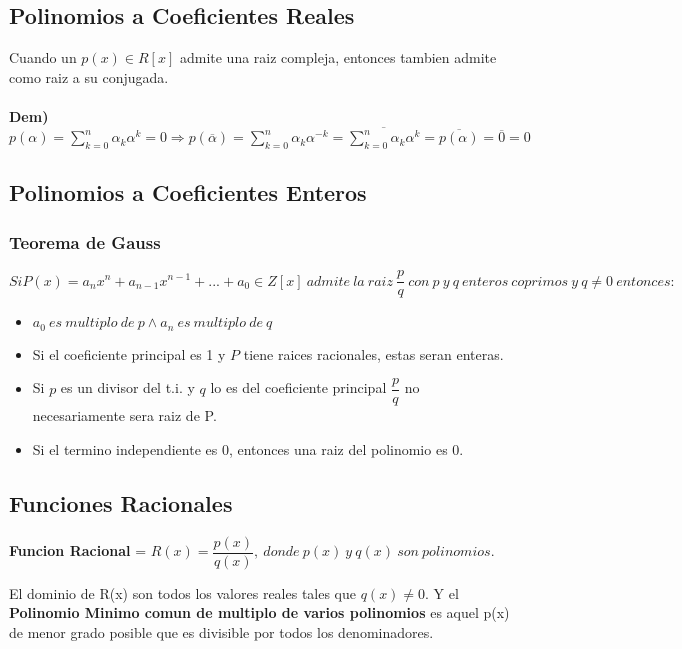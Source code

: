 \documentclass[10pt]{article}
\begin{document}
\subsection{Polinomios a Coeficientes Reales}
Cuando un $p(x) \in R[x]$ admite una raiz compleja, entonces tambien admite como raiz a su conjugada.\\
\\
\textbf{Dem) }$p(\alpha) = \sum\limits_{k=0}^n\alpha_k \alpha^k=0 \Rightarrow p(\overline{\alpha}) = \sum\limits_{k=0}^n\alpha_k \alpha^{-k}= \overline{\sum\limits_{k=0}^n\alpha_k \alpha^{k}} = \overline{p(\alpha)} = \overline{0} = 0$
\subsection{Polinomios a Coeficientes Enteros}
\subsubsection{Teorema de Gauss}
\begin{mdframed}[roundcorner=10pt]
$Si P(x)=a_nx^n+a_{n-1}x^{n-1}+...+a_0 \in Z[x]\ admite\ la\ raiz\ \dfrac{p}{q}\ con\ p\ y\ q\ enteros\ coprimos\ y\ q \not = 0\ entonces:$
\begin{itemize}
\item $a_0\ es\ multiplo\ de\ p \land a_n\ es\ multiplo\ de\ q$
\item Si el coeficiente principal es 1 y $P$ tiene raices racionales, estas seran enteras.
\item Si $p$ es un divisor del t.i. y $q$ lo es del coeficiente principal $\dfrac{p}{q}$ no necesariamente sera raiz de P.
\item Si el termino independiente es 0, entonces una raiz del polinomio es 0.
\end{itemize}
\end{mdframed}
\subsection{Funciones Racionales}
\begin{center}
\textbf{Funcion Racional} = $R(x)=\dfrac{p(x)}{q(x)},\ donde\ p(x)\ y\ q(x)\ son\ polinomios.$
\end{center}
El dominio de R(x) son todos los valores reales tales que $q(x) \not = 0$.
Y el \textbf{Polinomio Minimo comun de multiplo de varios polinomios} es aquel p(x) de menor grado posible que es divisible por todos los denominadores.
\end{document}
